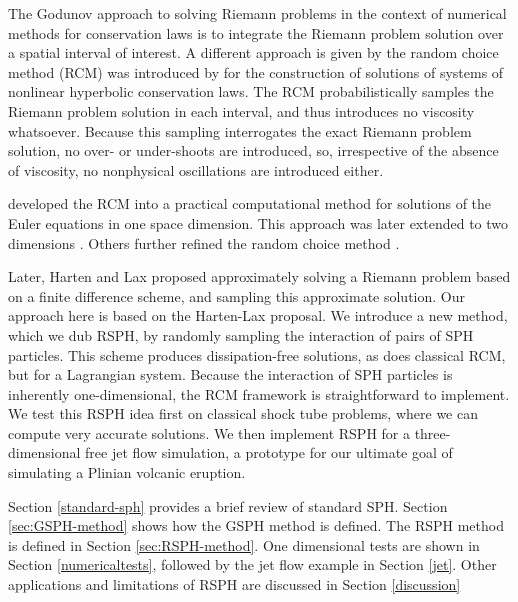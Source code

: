 \documentclass[review]{elsarticle}
\begin{document}
The Godunov approach to solving Riemann problems in the context of numerical methods for conservation laws is to integrate the Riemann problem solution over a spatial interval of interest. A different approach is given by the random choice method (RCM) was introduced by \citet{glimm1965solutions} for the construction of solutions of systems of nonlinear hyperbolic conservation laws. The RCM probabilistically samples the Riemann problem solution in each interval, and thus introduces no viscosity whatsoever. Because this sampling interrogates the exact Riemann problem solution, no over- or under-shoots are introduced, so, irrespective of the absence of viscosity, no nonphysical oscillations are introduced either.


\citet{chorin1976random} developed the RCM into a practical computational method for solutions of the Euler equations in one space dimension. This approach was later extended to two dimensions \cite{chorinporousmedium}. Others further refined the random choice method \citep{sod1977numerical,concus1979numerical,colella1982glimm, freistuhler1992numerical,toro2013riemann}. 

Later, Harten and Lax \cite{hartenlax} proposed approximately solving a Riemann problem based on a finite difference scheme, and sampling this approximate solution. Our approach here is based on the Harten-Lax proposal. We introduce a new method, which we dub RSPH, by randomly sampling the interaction of pairs of SPH particles. This scheme produces dissipation-free solutions, as does classical RCM, but for a Lagrangian system. Because the interaction of SPH particles is inherently one-dimensional, the RCM framework is straightforward to implement. We test this RSPH idea first on classical shock tube problems, where we can compute very accurate solutions.
We then implement RSPH for a three-dimensional free jet flow simulation, a prototype for our ultimate goal of simulating a Plinian volcanic eruption.

Section \ref{standard-sph} provides a brief review of standard SPH. Section \ref{sec:GSPH-method} shows how the GSPH method is defined. The RSPH method is defined in Section \ref{sec:RSPH-method}.
One dimensional tests are shown in Section \ref{numericaltests}, followed by the jet flow example in Section \ref{jet}. Other applications and limitations of RSPH are discussed in Section \ref{discussion}
\end{document}
